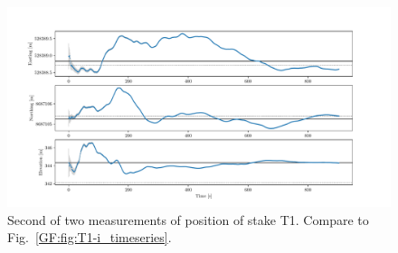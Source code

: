 \begin{figure}[H]
    \centering
    \includegraphics[width=\textwidth]{./figs/timeseries/46250723_corr-T1-ii-2017_Timeseries-east-north-elev.pdf}
    \caption{Second of two measurements of position of stake T1. Compare to Fig.~\ref{GF:fig:T1-i_timeseries}.}
    \label{GF:fig:T1-ii_timeseries}
\end{figure}
